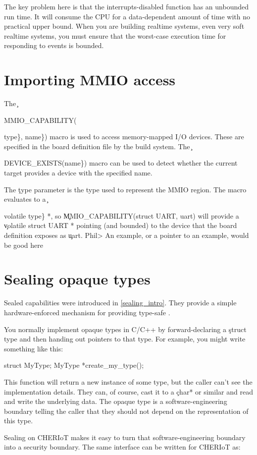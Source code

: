 {{The key problem here is that the interrupts-disabled function has an unbounded run time.
It will consume the CPU for a data-dependent amount of time with no practical upper bound.
When you are building realtime systems, even very soft realtime systems, you must ensure that the worst-case execution time for responding to events is bounded.

\section{Importing MMIO access}

The \c{MMIO_CAPABILITY({type\}, {name\})} macro is used to access memory-mapped I/O devices.
These are specified in the board definition file by the build system.
The \c{DEVICE_EXISTS({name\})} macro can be used to detect whether the current target provides a device with the specified name.

The \c{type} parameter is the type used to represent the MMIO region.
The macro evaluates to a \c{volatile {type\} *}, so \c{MMIO_CAPABILITY(struct UART, uart)} will provide a \c{volatile struct UART *} pointing (and bounded) to the device that the board definition exposes as \c{uart}.
Phil> An example, or a pointer to an example, would be good here

\section{Sealing opaque types}

Sealed capabilities were introduced in \ref{sealing_intro}.
They provide a simple hardware-enforced mechanism for providing type-safe .

You normally implement opaque types in C/C++ by forward-declaring a \c{struct} type and then handing out pointers to that type.
For example, you might write something like this:

\begin{cxxsnippet}
struct MyType;
MyType *create_my_type();
\end{cxxsnippet}

This function will return a new instance of some type, but the caller can't see the implementation details.
They can, of course, cast it to a \c{char*} or similar and read and write the underlying data.
The opaque type is a software-engineering boundary telling the caller that they should not depend on the representation of this type.

Sealing on CHERIoT makes it easy to turn that software-engineering boundary into a security boundary.
The same interface can be written for CHERIoT as:

}}}}}}
